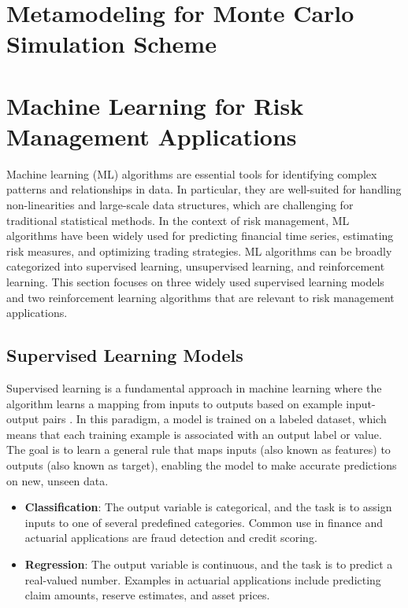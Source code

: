 \section{Metamodeling for Monte Carlo Simulation Scheme}

\section{Machine Learning for Risk Management Applications}

Machine learning (ML) algorithms are essential tools for identifying complex patterns and relationships in data. 
In particular, they are well-suited for handling non-linearities and large-scale data structures, which are challenging for traditional statistical methods. 
In the context of risk management, ML algorithms have been widely used for predicting financial time series, estimating risk measures, and optimizing trading strategies.
ML algorithms can be broadly categorized into supervised learning, unsupervised learning, and reinforcement learning.
This section focuses on three widely used supervised learning models and two reinforcement learning algorithms that are relevant to risk management applications.

\subsection{Supervised Learning Models}

Supervised learning is a fundamental approach in machine learning where the algorithm learns a mapping from inputs to outputs based on example input-output pairs \cite{galton1886regression}. 
In this paradigm, a model is trained on a labeled dataset, which means that each training example is associated with an output label or value. 
The goal is to learn a general rule that maps inputs (also known as features) to outputs (also known as target), enabling the model to make accurate predictions on new, unseen data.

\begin{itemize} 
    \item \textbf{Classification}: The output variable is categorical, and the task is to assign inputs to one of several predefined categories. 
    Common use in finance and actuarial applications are fraud detection and credit scoring.
    \item \textbf{Regression}: The output variable is continuous, and the task is to predict a real-valued number. 
    Examples in actuarial applications include predicting claim amounts, reserve estimates, and asset prices.
\end{itemize}

